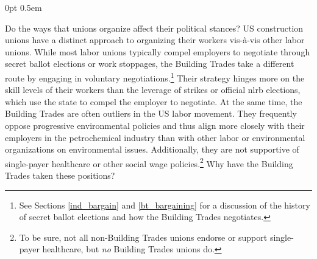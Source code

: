 \documentclass[12pt]{article}
\newlength{\myindent}
\begin{document}
\titlespacing*{\part}{0pt}{0pt}{10pt}
\titlespacing*{\section}{0pt}{0pt}{0pt} %
\titlespacing*{\subsection}{0pt}{0pt}{0pt}
\titlespacing*{\subsubsection}{0pt}{0pt}{0.5em}
\titlespacing*{\paragraph}
  {\myindent} %
  {0pt} %
  {0.5em} %


\clearpage %
{}

Do the ways that unions organize affect their political stances? US construction unions have a distinct approach to organizing their workers vis-à-vis other labor unions. While most labor unions typically compel employers to negotiate through secret ballot elections or work stoppages, the Building Trades take a different route by engaging in voluntary negotiations.\footnote{See Sections \ref{ind_bargain} and \ref{bt_bargaining} for a discussion of the history of secret ballot elections and how the Building Trades negotiates.} Their strategy hinges more on the skill levels of their workers than the leverage of strikes or official \acrfull{nlrb} elections, which use the state to compel the employer to negotiate. At the same time, the Building Trades are often outliers in the US labor movement. They frequently oppose progressive environmental policies and thus align more closely with their employers in the petrochemical industry than with other labor or environmental organizations on environmental issues. Additionally, they are not supportive of single-payer healthcare or other social wage policies.\footnote{To be sure, not all non-Building Trades unions endorse or support single-payer healthcare, but \emph{no} Building Trades unions do.} Why have the Building Trades taken these positions?
\end{document}
